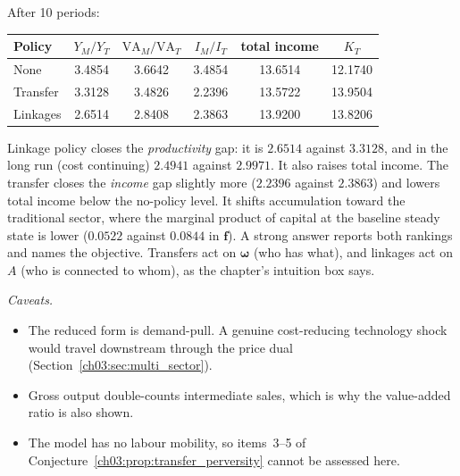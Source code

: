 \documentclass[../solutions_manual.tex]{subfiles}
\begin{document}
 After 10 periods:
\begin{center}
\begin{tabular}{lccccc}
\toprule
Policy & $Y_M/Y_T$ & $\text{VA}_M/\text{VA}_T$ & $I_M/I_T$ & total income & $K_T$ \\
\midrule
None & 3.4854 & 3.6642 & 3.4854 & 13.6514 & 12.1740\\
Transfer & 3.3128 & 3.4826 & 2.2396 & 13.5722 & 13.9504\\
Linkages & 2.6514 & 2.8408 & 2.3863 & 13.9200 & 13.8206\\
\bottomrule
\end{tabular}
\end{center}
Linkage policy closes the \emph{productivity} gap: it is $2.6514$ against $3.3128$, and in the long run (cost continuing) $2.4941$ against $2.9971$. It also raises total income. The transfer closes the \emph{income} gap slightly more ($2.2396$ against $2.3863$) and lowers total income below the no-policy level. It shifts accumulation toward the traditional sector, where the marginal product of capital at the baseline steady state is lower ($0.0522$ against $0.0844$ in $\mathbf f$). A strong answer reports both rankings and names the objective. Transfers act on $\boldsymbol\omega$ (who has what), and linkages act on $A$ (who is connected to whom), as the chapter's intuition box says.

\emph{Caveats.}
\begin{itemize}
\item The reduced form is demand-pull. A genuine cost-reducing technology shock would travel downstream through the price dual (Section~\ref{ch03:sec:multi_sector}).
\item Gross output double-counts intermediate sales, which is why the value-added ratio is also shown.
\item The model has no labour mobility, so items~3--5 of Conjecture~\ref{ch03:prop:transfer_perversity} cannot be assessed here.
\end{itemize}

\end{document}
